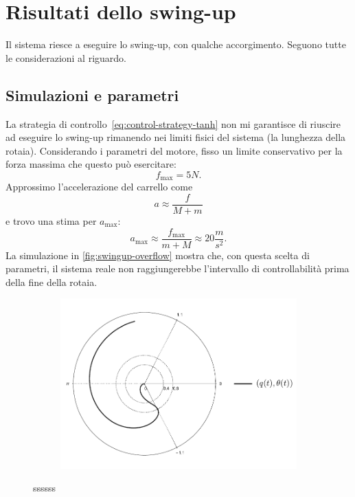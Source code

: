 \section{Risultati dello swing-up}
Il sistema riesce a eseguire lo swing-up, con qualche accorgimento.
Seguono tutte le considerazioni al riguardo.

\subsection{Simulazioni e parametri}
La strategia di controllo~\eqref{eq:control-strategy-tanh} non
mi garantisce di riuscire ad eseguire lo swing-up rimanendo nei
limiti fisici del sistema (la lunghezza della rotaia).
Considerando i parametri del motore, fisso un limite conservativo
per la forza massima che questo può esercitare:
\begin{equation*}
    f_{\max} = 5N.
\end{equation*}
Approssimo l'accelerazione del carrello come
\begin{equation*}
    a \approx \frac f {M + m}
\end{equation*}
e trovo una stima per $a_{\max}$:
\begin{equation*}
    a_{\max} \approx \frac {f_{\max}}{m+M} \approx 20 \frac m {s^2}.
\end{equation*}
La simulazione in \autoref{fig:swingup-overflow} mostra che,
con questa scelta di parametri, il sistema
reale non raggiungerebbe
l'intervallo di controllabilità prima della fine della rotaia.

\begin{figure}[h]
    \centering
    \begin{subfigure}[]{\textwidth}
        \centering
        \includegraphics[width=.8\textwidth]{assets/polar-swingup-simulation}
    \end{subfigure}

    \caption[sssss]{
        ssssss
    }
    \label{fig:swingup-overflow}
\end{figure}

